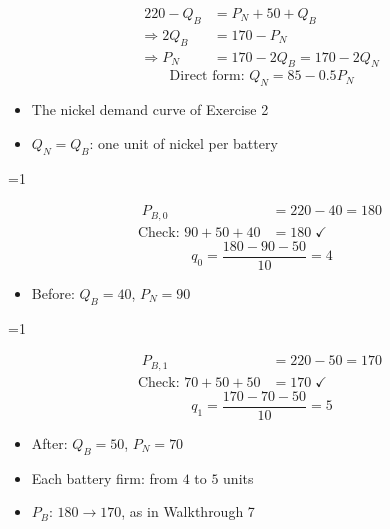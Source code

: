 \documentclass{beamer}
\newcommand{\showanswers}{0}
\begin{document}
\begin{frame}[plain,label=w2_wt6_derived]
  \Large
  \begin{align*}
    \tag{18}\;220 - Q_B &= P_N + 50 + Q_B\\
    \Rightarrow 2Q_B &= 170 - P_N\\
    \Rightarrow P_N &= 170 - 2Q_B = 170 - 2Q_N
  \end{align*}
  \[
    \tag{19}\;\text{Direct form: } Q_N = 85 - 0.5P_N
  \]

  \vspace{0.3em}
  \begin{itemize}\Large
    \item The nickel demand curve of Exercise 2
    \item $Q_N = Q_B$: one unit of nickel per battery
  \end{itemize}
\end{frame}

\ifnum\showanswers=1
\begin{frame}[plain,label=w2_ans_q32a]
  \Large
  \begin{align*}
    \tag{M36}\;P_{B,0} &= 220 - 40 = 180\\
    \text{Check: } 90 + 50 + 40 &= 180 \;\checkmark
  \end{align*}
  \[
    \tag{M37}\;q_0 = \frac{180 - 90 - 50}{10} = 4
  \]

  \vspace{0.3em}
  \begin{itemize}\Large
    \item Before: $Q_B = 40$, $P_N = 90$
  \end{itemize}
\end{frame}
\fi

\ifnum\showanswers=1
\begin{frame}[plain,label=w2_ans_q32b]
  \Large
  \begin{align*}
    \tag{M38}\;P_{B,1} &= 220 - 50 = 170\\
    \text{Check: } 70 + 50 + 50 &= 170 \;\checkmark
  \end{align*}
  \[
    \tag{M39}\;q_1 = \frac{170 - 70 - 50}{10} = 5
  \]

  \vspace{0.3em}
  \begin{itemize}\Large
    \item After: $Q_B = 50$, $P_N = 70$
    \item Each battery firm: from $4$ to $5$ units
    \item $P_B$: $180 \to 170$, as in Walkthrough 7
  \end{itemize}
\end{frame}
\fi
\end{document}
